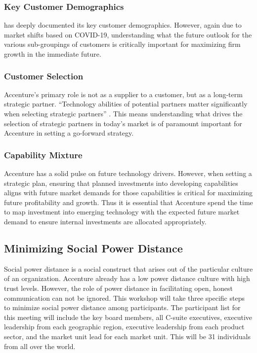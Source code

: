 \subsubsection{Key Customer Demographics}

\textcite{AccenturePLC2019} has deeply documented its key customer demographics. However, again due to market shifts based on COVID-19, understanding what the future outlook for the various sub-groupings of customers is critically important for maximizing firm growth in the immediate future.

\subsubsection{Customer Selection}

Accenture's primary role is not as a supplier to a customer, but as a long-term strategic partner. ``Technology abilities of potential partners matter significantly when selecting strategic partners'' \parencite{weiConceptualFrameworkTwostage2020}. This means understanding what drives the selection of strategic partners in today's market is of paramount important for Accenture in setting a go-forward strategy.

\subsubsection{Capability Mixture}

Accenture has a solid pulse on future technology drivers. However, when setting a strategic plan, ensuring that planned investments into developing capabilities aligns with future market demands for those capabilities is critical for maximizing future profitability and growth. Thus it is essential that Accenture spend the time to map investment into emerging technology with the expected future market demand to ensure internal investments are allocated appropriately.

\subsection{Minimizing Social Power Distance}

Social power distance is a social construct that arises out of the particular culture of an organization. Accenture already has a low power distance culture with high trust levels. However, the role of power distance in facilitating open, honest communication can not be ignored. This workshop will take three specific steps to minimize social power distance among participants. The participant list for this meeting will include the key board members, all C-suite executives, executive leadership from each geographic region, executive leadership from each product sector, and the market unit lead for each market unit. This will be 31 individuals from all over the world.

